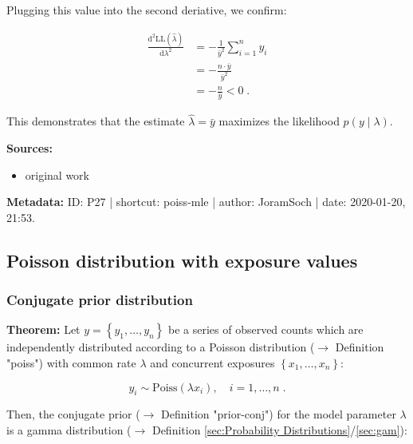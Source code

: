 \documentclass[a4paper,12pt]{book}
\begin{document}
Plugging this value into the second deriative, we confirm:

\begin{equation} \label{eq:poiss-mle-Poiss-d2LLdl2}
\begin{split}
\frac{\mathrm{d}^2\mathrm{LL}(\hat{\lambda})}{\mathrm{d}\lambda^2} &= -\frac{1}{\bar{y}^2} \sum_{i=1}^n y_i \\
&= -\frac{n \cdot \bar{y}}{\bar{y}^2} \\
&= -\frac{n}{\bar{y}} < 0 \; .
\end{split}
\end{equation}

This demonstrates that the estimate $\hat{\lambda} = \bar{y}$ maximizes the likelihood $p(y \mid \lambda)$.

\vspace{1em}
\textbf{Sources:}
\begin{itemize}
\item original work\end{itemize}


\vspace{1em}
\textbf{Metadata:} ID: P27 | shortcut: poiss-mle | author: JoramSoch | date: 2020-01-20, 21:53.


\subsection{Poisson distribution with exposure values}

\subsubsection[\textbf{Conjugate prior distribution}]{Conjugate prior distribution} \label{sec:poissexp-prior}

\vspace{1em}
\textbf{Theorem:} Let $y = \left\lbrace y_1, \ldots, y_n \right\rbrace$ be a series of observed counts which are independently distributed according to a Poisson distribution ($\rightarrow$ Definition "poiss") with common rate $\lambda$ and concurrent exposures $\left\lbrace x_1, \ldots, x_n \right\rbrace$:

\begin{equation} \label{eq:poissexp-prior-Poiss-exp}
y_i \sim \mathrm{Poiss}(\lambda x_i), \quad i = 1, \ldots, n \; .
\end{equation}

Then, the conjugate prior ($\rightarrow$ Definition "prior-conj") for the model parameter $\lambda$ is a gamma distribution ($\rightarrow$ Definition \ref{sec:Probability Distributions}/\ref{sec:gam}):
\end{document}
